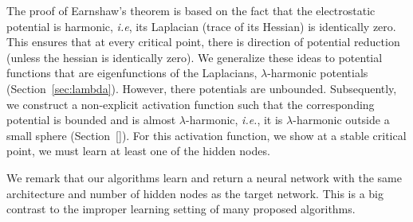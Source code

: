 
The proof of Earnshaw's theorem is based on the fact that the electrostatic potential is harmonic, \emph{i.e}, its Laplacian (trace of its Hessian) is identically zero. This ensures that at every critical point, there is direction of potential reduction (unless the hessian is identically zero). We generalize these ideas to potential functions that are eigenfunctions of the Laplacians, $\lambda$-harmonic potentials (Section~\ref{sec:lambda}). However, there potentials are unbounded. Subsequently, we construct a non-explicit activation function such that the corresponding potential is bounded and is almost $\lambda$-harmonic, \emph{i.e.}, it is $\lambda$-harmonic outside a small sphere (Section~\ref{}). For this activation function, we show at a stable critical point, we must learn at least one of the hidden nodes. 

We remark that our algorithms learn and return a neural network with the same architecture and number of hidden nodes as the target network. This is a big contrast to the improper learning setting of many proposed algorithms. 



